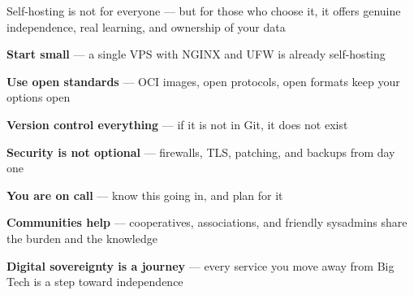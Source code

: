 \documentclass[Screen16to9,17pt]{foils}
\begin{document}



Self-hosting is not for everyone — but for those who choose it,
it offers genuine independence, real learning, and ownership of your data


\begin{list2}
\item {\bf Start small} — a single VPS with NGINX and UFW is already self-hosting
\item {\bf Use open standards} — OCI images, open protocols, open formats keep your options open
\item {\bf Version control everything} — if it is not in Git, it does not exist
\item {\bf Security is not optional} — firewalls, TLS, patching, and backups from day one
\item {\bf You are on call} — know this going in, and plan for it
\item {\bf Communities help} — cooperatives, associations, and friendly sysadmins
share the burden and the knowledge
\item {\bf Digital sovereignty is a journey} — every service you move away from Big Tech
is a step toward independence
\end{list2}


\myquestionspage
\end{document}
